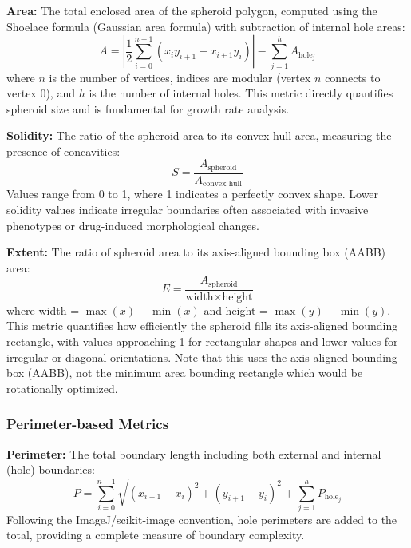 \documentclass[preprint,12pt]{elsarticle}
\begin{document}
\textbf{Area:} The total enclosed area of the spheroid polygon, computed using the Shoelace formula (Gaussian area formula) with subtraction of internal hole areas:
\begin{equation}
A = \left|\frac{1}{2} \sum_{i=0}^{n-1} (x_i y_{i+1} - x_{i+1} y_i)\right| - \sum_{j=1}^{h} A_{\text{hole}_j}
\end{equation}
where $n$ is the number of vertices, indices are modular (vertex $n$ connects to vertex 0), and $h$ is the number of internal holes. This metric directly quantifies spheroid size and is fundamental for growth rate analysis.

\textbf{Solidity:} The ratio of the spheroid area to its convex hull area, measuring the presence of concavities:
\begin{equation}
S = \frac{A_{\text{spheroid}}}{A_{\text{convex hull}}}
\end{equation}
Values range from 0 to 1, where 1 indicates a perfectly convex shape. Lower solidity values indicate irregular boundaries often associated with invasive phenotypes or drug-induced morphological changes.

\textbf{Extent:} The ratio of spheroid area to its axis-aligned bounding box (AABB) area:
\begin{equation}
E = \frac{A_{\text{spheroid}}}{\text{width} \times \text{height}}
\end{equation}
where width = $\max(x) - \min(x)$ and height = $\max(y) - \min(y)$. This metric quantifies how efficiently the spheroid fills its axis-aligned bounding rectangle, with values approaching 1 for rectangular shapes and lower values for irregular or diagonal orientations. Note that this uses the axis-aligned bounding box (AABB), not the minimum area bounding rectangle which would be rotationally optimized.

\subsubsection{Perimeter-based Metrics}

\textbf{Perimeter:} The total boundary length including both external and internal (hole) boundaries:
\begin{equation}
P = \sum_{i=0}^{n-1} \sqrt{(x_{i+1} - x_i)^2 + (y_{i+1} - y_i)^2} + \sum_{j=1}^{h} P_{\text{hole}_j}
\end{equation}
Following the ImageJ/scikit-image convention, hole perimeters are added to the total, providing a complete measure of boundary complexity.
\end{document}
